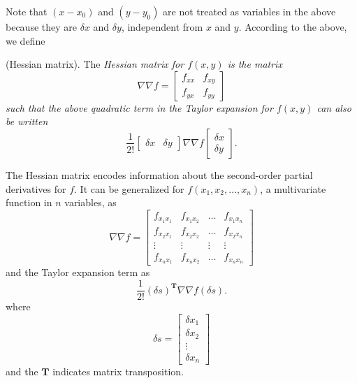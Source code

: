 \documentclass{article}
\begin{document}
Note that $(x-x_0)$ and $(y-y_0)$ are not treated as variables in the above because they are $\delta x$ and $\delta y$, independent from $x$ and $y$. According to the above, we define 
\begin{definition}
    (Hessian matrix). The \it Hessian matrix \normalfont for $f(x,y)$ is the matrix
    \begin{equation*}
        \nabla \nabla f = \begin{bmatrix}
            f_{xx} & f_{xy} \\
            f_{yx} & f_{yy}
        \end{bmatrix}
    \end{equation*}
    such that the above quadratic term in the Taylor expansion for $f(x,y)$ can also be written 
    \begin{equation*}
        \frac{1}{2!}\begin{bmatrix}
            \delta x & \delta y
        \end{bmatrix}\nabla \nabla f \begin{bmatrix}
            \delta x \\ \delta y
        \end{bmatrix}.
    \end{equation*}
\end{definition}
The Hessian matrix encodes information about the second-order partial derivatives for $f$. It can be generalized for $f(x_1,x_2,\dots,x_n)$, a multivariate function in $n$ variables, as 
    \begin{equation*}
        \nabla \nabla f = \begin{bmatrix}
            f_{x_1x_1} & f_{x_1x_2} & \dots & f_{x_1x_n} \\
            f_{x_2x_1} & f_{x_2x_2} & \dots & f_{x_2x_n} \\
            \vdots & \vdots & \vdots & \vdots \\
            f_{x_nx_1} & f_{x_n x_2} & \dots & f_{x_nx_n}
        \end{bmatrix}
    \end{equation*}
    and the Taylor expansion term as 
    \begin{equation*}
        \frac{1}{2!}(\delta s)^{\mathbf{T}}\nabla \nabla f (\delta s).
    \end{equation*}
    where 
    \begin{equation*}
        \delta s = \begin{bmatrix}
            \delta x_1 \\ \delta x_2 \\ \vdots \\ \delta x_n
        \end{bmatrix}
    \end{equation*}
    and the $\mathbf{T}$ indicates matrix transposition.
\end{document}
